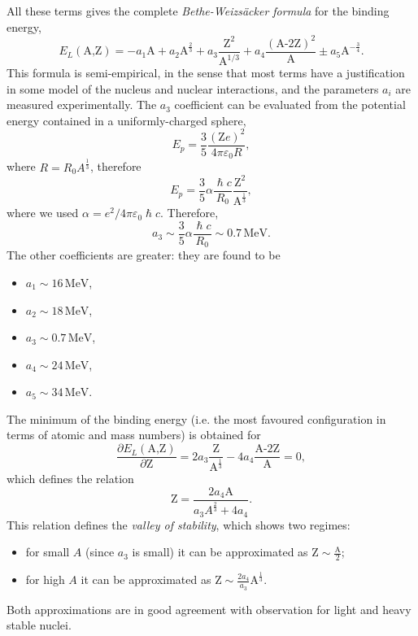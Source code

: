 All these terms gives the complete \emph{Bethe-Weizs\"acker formula} for the binding energy,
\begin{equation*}
    E_L(\mbox{A,Z}) = -a_1\mbox{A} + a_2\mbox{A}^{\frac{2}{3}} + a_3\frac{\mbox{Z}^2}{\mbox{A}^{1/3}} + a_4\frac{(\mbox{A-2Z})^2}{\mbox{A}} \pm a_5\mbox{A}^{-\frac{3}{4}}.
\end{equation*}
This formula is semi-empirical, in the sense that most terms have a justification in some model of the nucleus and nuclear interactions, and the parameters \(a_i\) are measured experimentally.
The $a_3$ coefficient can be evaluated from the potential energy contained in a uniformly-charged sphere,
\begin{equation*}
    E_p = \frac{3}{5}\frac{(\mbox{Z}e)^2}{4\pi \varepsilon_0 R},
\end{equation*}
where $R = R_0 A^{\frac{1}{3}}$, therefore
\begin{equation*}
    E_p = \frac{3}{5}\alpha \frac{\hslash c}{R_0}\frac{\mbox{Z}^2}{\mbox{A}^{\frac{1}{3}}},
\end{equation*}
where we used $\alpha = e^2 / 4\pi\varepsilon_0\hslash c$.
Therefore,
\begin{equation*}
    a_3 \sim \frac{3}{5}\alpha\frac{\hslash c}{R_0} \sim 0.7\,\mbox{MeV}.
\end{equation*}
The other coefficients are greater: they are found to be
\begin{itemize}
    \item $a_1 \sim 16\,\mbox{MeV}$,
    \item $a_2 \sim 18\,\mbox{MeV}$,
    \item $a_3 \sim 0.7\,\mbox{MeV}$,
    \item $a_4 \sim 24\,\mbox{MeV}$,
    \item $a_5 \sim 34\,\mbox{MeV}$.
\end{itemize}

The minimum of the binding energy (i.e. the most favoured configuration in terms of atomic and mass numbers) is obtained for
\begin{equation*}
    \frac{\partial E_L (\mbox{A,Z})}{\partial \mbox{Z}} = 2a_3\frac{\mbox{Z}}{\mbox{A}^{\frac{1}{3}}} - 4a_4\frac{\mbox{A-2Z}}{\mbox{A}} = 0,
\end{equation*}
which defines the relation
\begin{equation*}
    \mbox{Z} = \frac{2a_4\mbox{A}}{a_3A^\frac{2}{3}+4a_4}.
\end{equation*}
This relation defines the \emph{valley of stability}, which shows two regimes:
\begin{itemize}
    \item for small \(A\) (since $a_3$ is small) it can be approximated as $\mbox{Z} \sim \frac{\mbox{A}}{2}$;
    \item for high \(A\) it can be approximated as $\mbox{Z} \sim \frac{2a_4}{a_3}\mbox{A}^{\frac{1}{3}}$.
\end{itemize}
Both approximations are in good agreement with observation for light and heavy stable nuclei.

